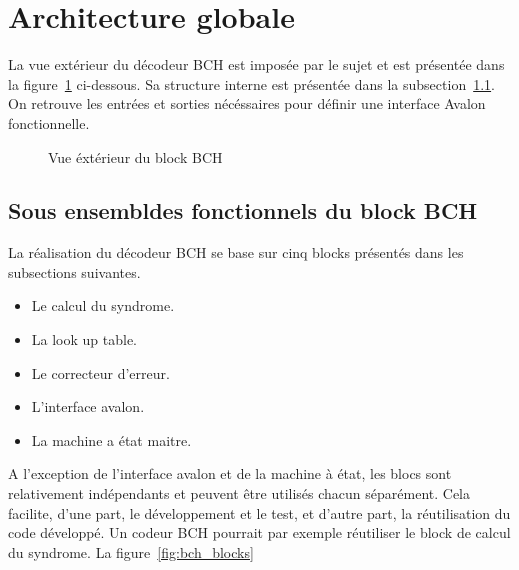 \documentclass[a4paper, 11pt, svgnames]{report}
\begin{document}
        \section{Architecture globale}
        La vue extérieur du décodeur BCH est imposée par le sujet et est
        présentée dans la figure~\ref{fig:bch} ci-dessous. Sa structure
        interne est présentée dans la subsection~\ref{sec:fonc_bch}. On
        retrouve les entrées et sorties nécéssaires pour définir une
        interface Avalon fonctionnelle.

            \begin{figure}[H]
                \centering
                \caption{Vue éxtérieur du block BCH}
                \label{fig:bch}
            \end{figure}

            \subsection{Sous ensembldes fonctionnels du block BCH}
            \label{sec:fonc_bch}
            La réalisation du décodeur BCH se base sur cinq blocks
            présentés dans les subsections suivantes.
            \begin{itemize}
                \item Le calcul du syndrome.
                \item La look up table.
                \item Le correcteur d'erreur.
                \item L'interface avalon.
                \item La machine a état maitre.
            \end{itemize}
            A l'exception de l'interface avalon et de la machine à état, les
            blocs sont relativement indépendants et peuvent être utilisés
            chacun séparément. Cela facilite, d'une part, le développement et
            le test, et d'autre part, la réutilisation du code développé. Un
            codeur BCH pourrait par exemple réutiliser le block de calcul du
            syndrome. La figure~\ref{fig:bch_blocks}
\end{document}
